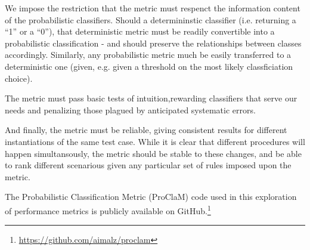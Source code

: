 We impose the restriction that the metric must respenct the information content of the probabilistic classifiers.
Should a determininstic classifier (i.e. returning a ``1'' or a ``0''), that deterministic metric must be readily convertible into a probabilistic classification - and should preserve the relationships between classes accordingly.
Similarly, any probabilistic metric much be easily transferred to a deterministic one (given, e.g. given a threshold on the most likely classficiation choice).

The metric must pass basic tests of intuition,rewarding classifiers that serve our needs and penalizing those plagued by anticipated systematic errors.

And finally, the metric must be reliable, giving consistent results for different instantiations of the same test case.
While it is clear that different procedures will happen simultansously, the metric should be stable to these changes, and be able to rank different scenarious given any particular set of rules imposed upon the metric.

The Probabilistic Classification Metric (ProClaM) code used in this exploration of performance metrics is publicly available on GitHub.\footnote{\url{https://github.com/aimalz/proclam}}
